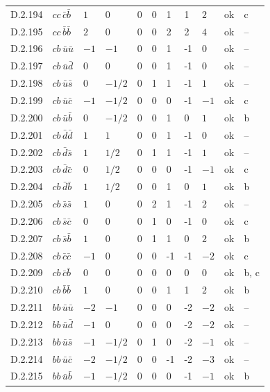 {\begin{longtable}{@{}llllllllll>{\raggedright\arraybackslash}p{2.0cm}@{}}
D.2.194 & $cc\,\bar{c}\bar{b}$ & $1$ & $0$ & $0$ & 0 & 1 & 1 & $2$ & ok & c \\
D.2.195 & $cc\,\bar{b}\bar{b}$ & $2$ & $0$ & $0$ & 0 & 2 & 2 & $4$ & ok & -- \\
D.2.196 & $cb\,\bar{u}\bar{u}$ & $-1$ & $-1$ & $0$ & 0 & 1 & -1 & $0$ & ok & -- \\
D.2.197 & $cb\,\bar{u}\bar{d}$ & $0$ & $0$ & $0$ & 0 & 1 & -1 & $0$ & ok & -- \\
D.2.198 & $cb\,\bar{u}\bar{s}$ & $0$ & $-1/2$ & $0$ & 1 & 1 & -1 & $1$ & ok & -- \\
D.2.199 & $cb\,\bar{u}\bar{c}$ & $-1$ & $-1/2$ & $0$ & 0 & 0 & -1 & $-1$ & ok & c \\
D.2.200 & $cb\,\bar{u}\bar{b}$ & $0$ & $-1/2$ & $0$ & 0 & 1 & 0 & $1$ & ok & b \\
D.2.201 & $cb\,\bar{d}\bar{d}$ & $1$ & $1$ & $0$ & 0 & 1 & -1 & $0$ & ok & -- \\
D.2.202 & $cb\,\bar{d}\bar{s}$ & $1$ & $1/2$ & $0$ & 1 & 1 & -1 & $1$ & ok & -- \\
D.2.203 & $cb\,\bar{d}\bar{c}$ & $0$ & $1/2$ & $0$ & 0 & 0 & -1 & $-1$ & ok & c \\
D.2.204 & $cb\,\bar{d}\bar{b}$ & $1$ & $1/2$ & $0$ & 0 & 1 & 0 & $1$ & ok & b \\
D.2.205 & $cb\,\bar{s}\bar{s}$ & $1$ & $0$ & $0$ & 2 & 1 & -1 & $2$ & ok & -- \\
D.2.206 & $cb\,\bar{s}\bar{c}$ & $0$ & $0$ & $0$ & 1 & 0 & -1 & $0$ & ok & c \\
D.2.207 & $cb\,\bar{s}\bar{b}$ & $1$ & $0$ & $0$ & 1 & 1 & 0 & $2$ & ok & b \\
D.2.208 & $cb\,\bar{c}\bar{c}$ & $-1$ & $0$ & $0$ & 0 & -1 & -1 & $-2$ & ok & c \\
D.2.209 & $cb\,\bar{c}\bar{b}$ & $0$ & $0$ & $0$ & 0 & 0 & 0 & $0$ & ok & b, c \\
D.2.210 & $cb\,\bar{b}\bar{b}$ & $1$ & $0$ & $0$ & 0 & 1 & 1 & $2$ & ok & b \\
D.2.211 & $bb\,\bar{u}\bar{u}$ & $-2$ & $-1$ & $0$ & 0 & 0 & -2 & $-2$ & ok & -- \\
D.2.212 & $bb\,\bar{u}\bar{d}$ & $-1$ & $0$ & $0$ & 0 & 0 & -2 & $-2$ & ok & -- \\
D.2.213 & $bb\,\bar{u}\bar{s}$ & $-1$ & $-1/2$ & $0$ & 1 & 0 & -2 & $-1$ & ok & -- \\
D.2.214 & $bb\,\bar{u}\bar{c}$ & $-2$ & $-1/2$ & $0$ & 0 & -1 & -2 & $-3$ & ok & -- \\
D.2.215 & $bb\,\bar{u}\bar{b}$ & $-1$ & $-1/2$ & $0$ & 0 & 0 & -1 & $-1$ & ok & b \\

\end{longtable}}
